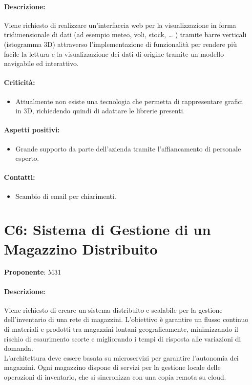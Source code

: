 \documentclass{TWDocumentNoVersion}
\begin{document}
    \paragraph{Descrizione:\\}
    {Viene richiesto di realizzare un'interfaccia web per la visualizzazione in forma tridimensionale di dati (ad esempio meteo, voli, stock, … ) tramite barre verticali (istogramma 3D) attraverso l'implementazione di funzionalità per rendere più facile la lettura e la visualizzazione dei dati di origine tramite un modello navigabile ed interattivo.}
    \paragraph{Criticità:}
    \begin{itemize}
        \item Attualmente non esiste una tecnologia che permetta di rappresentare grafici in 3D, richiedendo quindi di adattare le librerie presenti.
    \end{itemize}
    \paragraph{Aspetti positivi:}
    \begin{itemize}
        \item Grande supporto da parte dell'azienda tramite l'affiancamento di personale esperto.
    \end{itemize}
    \paragraph{Contatti:}
    \begin{itemize}
        \item Scambio di email per chiarimenti.
    \end{itemize}

    \section*{C6: Sistema di Gestione di un Magazzino Distribuito}
    {\textbf{Proponente}: M31}
    \paragraph{Descrizione:\\}
    {Viene richiesto di creare un sistema distribuito e scalabile per la gestione dell'inventario di una rete di magazzini. L'obiettivo è garantire un flusso continuo di materiali e prodotti tra magazzini lontani geograficamente, minimizzando il rischio di esaurimento scorte e migliorando i tempi di risposta alle variazioni di domanda. \\L'architettura deve essere basata su microservizi per garantire l'autonomia dei magazzini. Ogni magazzino dispone di servizi per la gestione locale delle operazioni di inventario, che si sincronizza con una copia remota su cloud.
}
\end{document}
